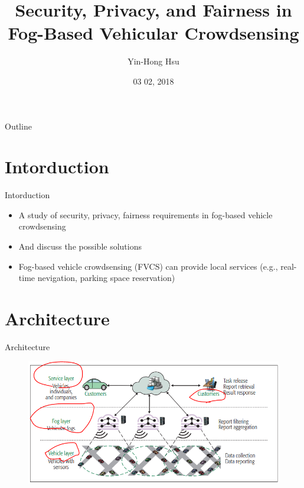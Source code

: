 \documentclass{beamer}
\title {
    Security, Privacy, and Fairness in Fog-Based Vehicular Crowdsensing\cite{JNI2017}
}
\author {
    Yin-Hong Hsu
}
\date {
    03 02, 2018
}
\begin{document}
\begin{frame}
    \titlepage
\end{frame}


\begin{frame}{Outline}
    \tableofcontentsgather
    \tableofcontents
\end{frame}

\section{Intorduction}
\begin{frame}{Intorduction}
    \begin{itemize}
        \item {A study of security, privacy, fairness requirements in fog-based vehicle crowdsensing}
        \item {And discuss the possible solutions}
        \item {Fog-based vehicle crowdsensing (FVCS) can provide local services (e.g., real-time nevigation, parking space reservation)}
    \end{itemize}
\end{frame}
\section{Architecture}
\begin{frame}{Architecture}
    \begin{figure}[t]
        \centering
        \includegraphics[width=1.0\textwidth]{figures/1.png}
        
    \end{figure}
\end{frame}
\end{document}
